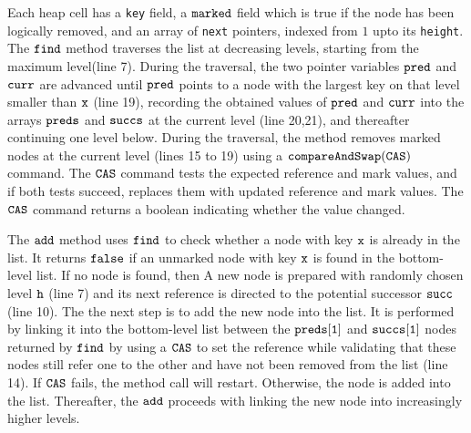 Each heap cell has a {\tt key} field, a $\tt marked$ field which is true if the node has been logically removed, and an array of {\tt next} pointers, indexed from
$1$ upto its {\tt height}.
The $\tt find$ method traverses the list at decreasing levels, starting from
the maximum level(line 7). During the traversal, the two pointer variables $\tt pred$ and $\tt curr$ are advanced until $\tt pred$ points to a node with the largest key on that level smaller than $\tt x$ (line 19), recording the
obtained values of  $\tt pred$ and $\tt curr$ into the arrays
$\tt preds$ and $\tt succs$ at the current level (line 20,21), and thereafter
continuing one level below.
During the traversal, the method removes marked nodes at the current level
(lines 15 to 19) using a $\tt compareAndSwap(CAS)$ command. The $\tt CAS$ command tests the expected reference and mark values, and if both tests succeed, replaces them with updated reference and mark values.  
The $\tt CAS$ command returns a boolean indicating whether the value changed.

The $\tt add$ method uses $\tt find$ to check whether a node with key $\tt x$ is already in the list. It returns $\tt false$ if an unmarked node with key $\tt x$ is found in the bottom-level list. If no node is found, then  A new node is prepared with randomly chosen level $\tt h$ (line 7) and its next reference is directed to the potential
successor $\tt succ$ (line 10). The the next step is to add the new node into the list. It is performed by linking it into the bottom-level list between the $\tt preds[1]$ and $\tt succs[1]$ nodes returned by $\tt find$ by using a $\tt CAS$ to set the reference while validating that these nodes still refer one to the other and have not been removed from the list (line 14). If $\tt CAS$ fails, the method call will restart. Otherwise, the node is added into the list. Thereafter, the $\tt add$ proceeds with linking the new node into increasingly higher levels.
 
